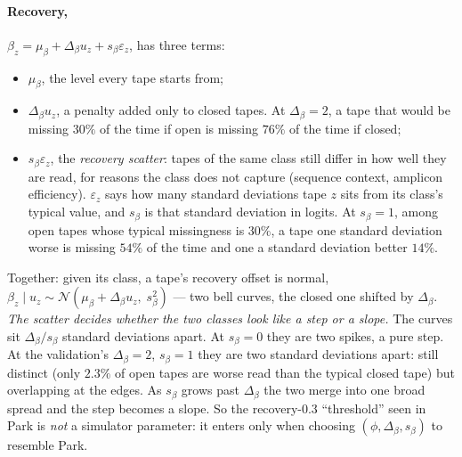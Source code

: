 \paragraph{Recovery,} $\beta_z=\mu_\beta+\Delta_\beta u_z+s_\beta\varepsilon_z$, has three terms:
\begin{itemize}
  \item $\mu_\beta$, the level every tape starts from;
  \item $\Delta_\beta u_z$, a penalty added only to closed tapes. At $\Delta_\beta=2$, a tape that would
        be missing $30\%$ of the time if open is missing $76\%$ of the time if closed;
  \item $s_\beta\varepsilon_z$, the \emph{recovery scatter}: tapes of the same class still differ in
        how well they are read, for reasons the class does not capture (sequence context, amplicon
        efficiency). $\varepsilon_z$ says how many standard deviations tape $z$ sits from its class's
        typical value, and $s_\beta$ is that standard deviation in logits. At $s_\beta=1$, among open
        tapes whose typical missingness is $30\%$, a tape one standard deviation worse is missing $54\%$
        of the time and one a standard deviation better $14\%$.
\end{itemize}
Together: given its class, a tape's recovery offset is normal,
$\beta_z\mid u_z\sim\mathcal N(\mu_\beta+\Delta_\beta u_z,\;s_\beta^2)$ --- two bell curves, the closed
one shifted by $\Delta_\beta$. \emph{The scatter decides whether the two classes look like a step or a
slope.} The curves sit $\Delta_\beta/s_\beta$ standard deviations apart. At $s_\beta=0$ they are two
spikes, a pure step. At the validation's $\Delta_\beta=2$, $s_\beta=1$ they are two standard deviations
apart: still distinct (only $2.3\%$ of open tapes are worse read than the typical closed tape) but
overlapping at the edges. As $s_\beta$ grows past $\Delta_\beta$ the two merge into one broad spread and
the step becomes a slope. So the recovery-$0.3$ ``threshold'' seen in Park is \emph{not} a simulator
parameter: it enters only when choosing $(\phi,\Delta_\beta,s_\beta)$ to resemble Park.

